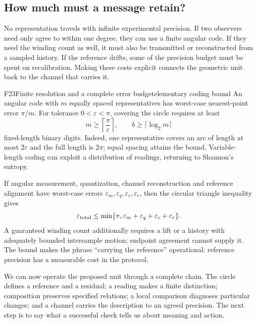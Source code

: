 \documentclass[11pt,a4paper]{article}
\begin{document}
\subsection{How much must a message retain?}
No representation travels with infinite experimental precision. If two
observers need only agree to within one degree, they can use a finite angular
code. If they need the winding count as well, it must also be transmitted or
reconstructed from a sampled history. If the reference drifts, some of the
precision budget must be spent on recalibration. Making these costs explicit
connects the geometric unit back to the channel that carries it.

\begin{formal}{F23}{Finite resolution and a complete error budget}{elementary coding bound}
An angular code with $m$ equally spaced representatives has worst-case
nearest-point error $\pi/m$. For tolerance $0<\varepsilon<\pi$, covering
the circle requires at least
\begin{equation}
 m\geq\left\lceil\frac{\pi}{\varepsilon}\right\rceil,
 \qquad b\geq\lceil\log_2m\rceil
\end{equation}
fixed-length binary digits. Indeed, one representative covers an arc of
length at most $2\varepsilon$ and the full length is $2\pi$; equal spacing
attains the bound. Variable-length coding can exploit a distribution of
readings, returning to Shannon's entropy.

If angular measurement, quantization, channel reconstruction and reference
alignment have worst-case errors $\varepsilon_m,\varepsilon_q,
\varepsilon_c,\varepsilon_r$, then the circular triangle inequality gives
\begin{equation}\label{eq:errorbudget}
 \varepsilon_{\rm total}\leq
 \min\{\pi,\varepsilon_m+\varepsilon_q+\varepsilon_c+\varepsilon_r\}.
\end{equation}
A guaranteed winding count additionally requires a lift or a history with
adequately bounded intersample motion; endpoint agreement cannot supply it.
The bound makes the phrase ``carrying the reference'' operational: reference
precision has a measurable cost in the protocol.
\end{formal}

We can now operate the proposed unit through a complete chain. The circle
defines a reference and a residual; a reading makes a finite distinction;
composition preserves specified relations; a local comparison diagnoses
particular changes; and a channel carries the description to an agreed
precision. The next step is to say what a successful check tells us about
meaning and action.
\end{document}
